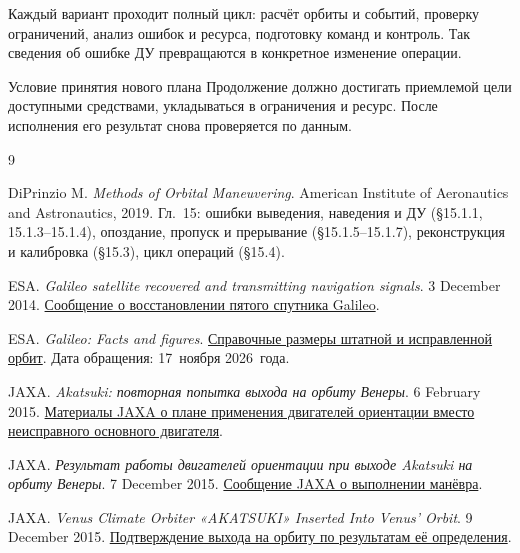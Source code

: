 \documentclass[a4paper,11pt]{article}
\numberwithin{equation}{section}
\begin{document}
Каждый вариант проходит полный цикл:
расчёт орбиты и событий, проверку ограничений,
анализ ошибок и ресурса, подготовку команд и контроль.
Так сведения об ошибке ДУ превращаются в конкретное
изменение операции.

\begin{explanation}{Условие принятия нового плана}
Продолжение должно достигать приемлемой цели
доступными средствами, укладываться в ограничения и ресурс.
После исполнения его результат снова проверяется по данным.
\end{explanation}
\FloatBarrier

\begin{thebibliography}{9}
DiPrinzio M. \textit{Methods of Orbital Maneuvering}.
American Institute of Aeronautics and Astronautics, 2019.
Гл.~15: ошибки выведения, наведения и ДУ (§15.1.1, 15.1.3--15.1.4),
опоздание, пропуск и прерывание (§15.1.5--15.1.7),
реконструкция и калибровка (§15.3), цикл операций (§15.4).

ESA. \textit{Galileo satellite recovered and transmitting navigation signals}.
3 December 2014.
\href{https://www.esa.int/Newsroom/Press_Releases/Galileo_satellite_recovered_and_transmitting_navigation_signals}
{Сообщение о восстановлении пятого спутника Galileo}.

ESA. \textit{Galileo: Facts and figures}.
\href{https://www.esa.int/Applications/Satellite_navigation/Galileo/Facts_and_figures}
{Справочные размеры штатной и исправленной орбит}.
Дата обращения: 17~ноября 2026~года.

JAXA. \textit{Akatsuki: повторная попытка выхода на орбиту Венеры}.
6 February 2015.
\href{https://www.isas.jaxa.jp/topics/files/20150206_akatsuki.pdf}
{Материалы JAXA о плане применения двигателей ориентации
вместо неисправного основного двигателя}.

JAXA. \textit{Результат работы двигателей ориентации
при выходе Akatsuki на орбиту Венеры}. 7 December 2015.
\href{https://www.jaxa.jp/press/2015/12/20151207_akatsuki_j.html}
{Сообщение JAXA о выполнении манёвра}.

JAXA. \textit{Venus Climate Orbiter «AKATSUKI» Inserted Into Venus' Orbit}.
9 December 2015.
\href{https://global.jaxa.jp/press/2015/12/20151209_akatsuki.html}
{Подтверждение выхода на орбиту по результатам её определения}.
\end{thebibliography}
\end{document}
